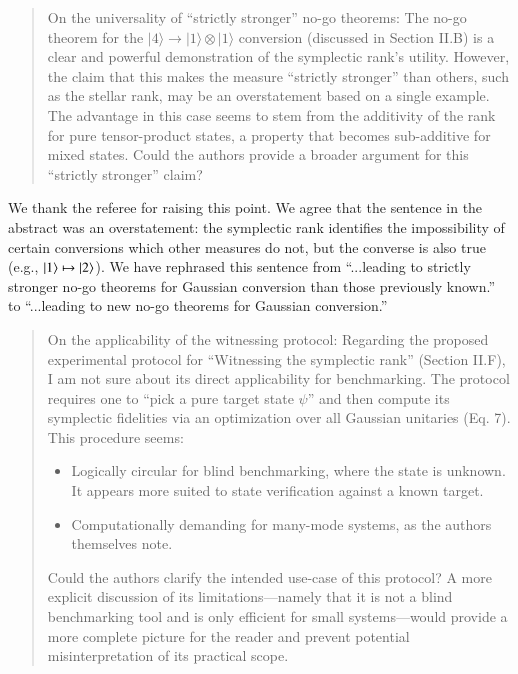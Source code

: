 \documentclass[a4paper,12pt]{article}
\newenvironment{Referee}[1]
{\noindent {\bf Comment #1:} \begin{quote} }
{\end{quote}\vspace{0 cm}}
\newenvironment{Response}
{\noindent \color{RawSienna}{\bf Response:} }
{\vspace{0.4 cm}}
\begin{document}
\begin{Referee}{2}
On the universality of ``strictly stronger'' no-go theorems: The no-go theorem for the $|4\rangle \to |1\rangle\otimes|1\rangle$ conversion (discussed in Section II.B) is a clear and powerful demonstration of the symplectic rank's utility. However, the claim that this makes the measure ``strictly stronger'' than others, such as the stellar rank, may be an overstatement based on a single example. The advantage in this case seems to stem from the additivity of the rank for pure tensor-product states, a property that becomes sub-additive for mixed states. Could the authors provide a broader argument for this ``strictly stronger'' claim?
\end{Referee}

\begin{Response}
    We thank the referee for raising this point. We agree that the sentence in the abstract was an overstatement: the symplectic rank identifies the impossibility of certain conversions which other measures do not, but the converse is also true (e.g., $\ket1\mapsto\ket2$). We have rephrased this sentence from ``...leading to strictly stronger no-go theorems for Gaussian conversion than those previously known.'' to ``...leading to new no-go theorems for Gaussian conversion.''
\end{Response}

\begin{Referee}{3}
On the applicability of the witnessing protocol: Regarding the proposed experimental protocol for ``Witnessing the symplectic rank'' (Section II.F), I am not sure about its direct applicability for benchmarking. The protocol requires one to ``pick a pure target state $\psi$'' and then compute its symplectic fidelities via an optimization over all Gaussian unitaries (Eq. 7). This procedure seems: 
\begin{itemize}
\item[(a)] Logically circular for blind benchmarking, where the state is unknown. It appears more suited to state verification against a known target.
\item[(b)] Computationally demanding for many-mode systems, as the authors themselves note.
\end{itemize}
Could the authors clarify the intended use-case of this protocol? A more explicit discussion of its limitations—namely that it is not a blind benchmarking tool and is only efficient for small systems—would provide a more complete picture for the reader and prevent potential misinterpretation of its practical scope.
\end{Referee}
\end{document}

